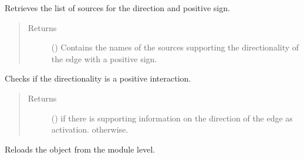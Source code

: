 \documentclass[letterpaper,10pt,english]{sphinxmanual}
\begin{document}
\begin{fulllineitems}
\begin{fulllineitems}
\label{\detokenize{main:pypath.main.Direction.positive_sources_straight}}
Retrieves the list of sources for the 
direction and positive sign.
\begin{quote}\begin{description}
\item[{Returns}] \leavevmode
() \textendash{} Contains the names of the sources supporting the
 directionality of the edge with a
positive sign.

\end{description}\end{quote}

\end{fulllineitems}


\begin{fulllineitems}
\label{\detokenize{main:pypath.main.Direction.positive_straight}}
Checks if the  directionality is a positive
interaction.
\begin{quote}\begin{description}
\item[{Returns}] \leavevmode
() \textendash{}  if there is supporting information on
the  direction of the edge as activation.
 otherwise.

\end{description}\end{quote}

\end{fulllineitems}


\begin{fulllineitems}
\label{\detokenize{main:pypath.main.Direction.reload}}
Reloads the object from the module level.

\end{fulllineitems}



\end{fulllineitems}
\end{document}
